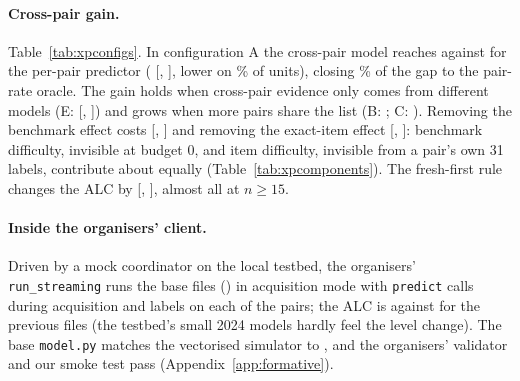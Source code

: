 \documentclass{article}
\begin{document}
\begin{table}[t]
\caption{Round-4 simulation on the training release: Brier ALC by test-set configuration, units (test set, pair), 95\% cluster-bootstrap CIs over benchmarks. S0: our rounds 1--3 per-pair predictor as the evaluator runs it; S1: the same with the target pair's labels only; XP: cross-pair model (nested selection; level constants of \FmShipId); oracle: each pair's evaluation success rate as a constant.}
\label{tab:xpconfigs}
\centering\footnotesize\setlength{\tabcolsep}{3pt}
\end{table}

\paragraph{Cross-pair gain.} Table~\ref{tab:xpconfigs}. In configuration A the cross-pair model reaches \XpCAXpAlc{} against \XpCASZeroAlc{} for the per-pair predictor (\XpCADiffSZeroMean{} [\XpCADiffSZeroLo, \XpCADiffSZeroHi], lower on \XpCADiffSZeroFracNeg\% of units), closing \XpCAGapClosed\% of the gap to the pair-rate oracle. The gain holds when cross-pair evidence only comes from different models (E: \XpCEDiffSZeroMean{} [\XpCEDiffSZeroLo, \XpCEDiffSZeroHi]) and grows when more pairs share the list (B: \XpCBDiffSZeroMean; C: \XpCCDiffSZeroMean). Removing the benchmark effect costs \XpCompABenchMean{} [\XpCompABenchLo, \XpCompABenchHi] and removing the exact-item effect \XpCompAItemMean{} [\XpCompAItemLo, \XpCompAItemHi]: benchmark difficulty, invisible at budget 0, and item difficulty, invisible from a pair's own 31 labels, contribute about equally (Table~\ref{tab:xpcomponents}). The fresh-first rule changes the ALC by \XpAcqMean{} [\XpAcqLo, \XpAcqHi], almost all at $n\ge15$.

\paragraph{Inside the organisers' client.} Driven by a mock coordinator on the local testbed, the organisers' \texttt{run\_streaming} runs the base files (\SelId) in \texttt{\CkSelLoopMode} acquisition mode with \CkSelLoopAcqPredCalls{} \texttt{predict} calls during acquisition and \CkSelLoopLabels{} labels on each of the \CkSelLoopNPairs{} pairs; the ALC is \CkSelLoopAlc{} against \CkShipLoopAlc{} for the previous files (the testbed's small 2024 models hardly feel the level change). The base \texttt{model.py} matches the vectorised simulator to \CkSelEquivMaxDiff, and the organisers' validator and our smoke test pass (Appendix~\ref{app:formative}).
\end{document}
